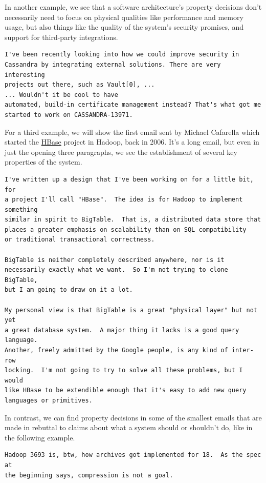 \documentclass[a4paper, 12pt]{article}
\begin{document}
			In another example, we see that a software architecture's property decisions don't necessarily need to focus on physical qualities like performance and memory usage, but also things like the quality of the system's security promises, and support for third-party integrations.
			\begin{verbatim}
I've been recently looking into how we could improve security in
Cassandra by integrating external solutions. There are very interesting
projects out there, such as Vault[0], ...
... Wouldn't it be cool to have
automated, build-in certificate management instead? That's what got me
started to work on CASSANDRA-13971.
			\end{verbatim}
		
			For a third example, we will show the first email sent by Michael Cafarella which started the \href{https://hbase.apache.org/}{HBase} project in Hadoop, back in 2006. It's a long email, but even in just the opening three paragraphs, we see the establishment of several key properties of the system.
			\begin{verbatim}
I've written up a design that I've been working on for a little bit, for
a project I'll call "HBase".  The idea is for Hadoop to implement something
similar in spirit to BigTable.  That is, a distributed data store that
places a greater emphasis on scalability than on SQL compatibility
or traditional transactional correctness.

BigTable is neither completely described anywhere, nor is it
necessarily exactly what we want.  So I'm not trying to clone BigTable,
but I am going to draw on it a lot.

My personal view is that BigTable is a great "physical layer" but not yet
a great database system.  A major thing it lacks is a good query language.
Another, freely admitted by the Google people, is any kind of inter-row
locking.  I'm not going to try to solve all these problems, but I would
like HBase to be extendible enough that it's easy to add new query
languages or primitives.
			\end{verbatim}
		
			In contrast, we can find property decisions in some of the smallest emails that are made in rebuttal to claims about what a system should or shouldn't do, like in the following example.
			\begin{verbatim}
Hadoop 3693 is, btw, how archives got implemented for 18.  As the spec at
the beginning says, compression is not a goal.
			\end{verbatim}
		
\end{document}
